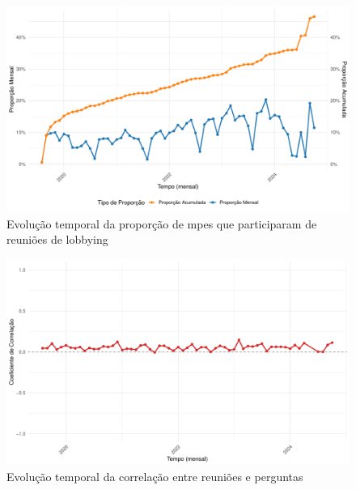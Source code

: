 \begin{figure}[htbp]
    \centering
    \includegraphics[width=\textwidth]{figures/descriptive_plots/fig2_proportion_meetings.pdf}
    \caption{Evolução temporal da proporção de \acrshort{mpe}s que participaram de reuniões de lobbying}
    \label{fig:proportion_meetings}
\end{figure}

\begin{figure}[htbp]
    \centering
    \includegraphics[width=\textwidth]{figures/descriptive_plots/fig3_correlation_meetings_questions.pdf}
    \caption{Evolução temporal da correlação entre reuniões e perguntas}
    \label{fig:correlation_meetings_questions}
\end{figure}

